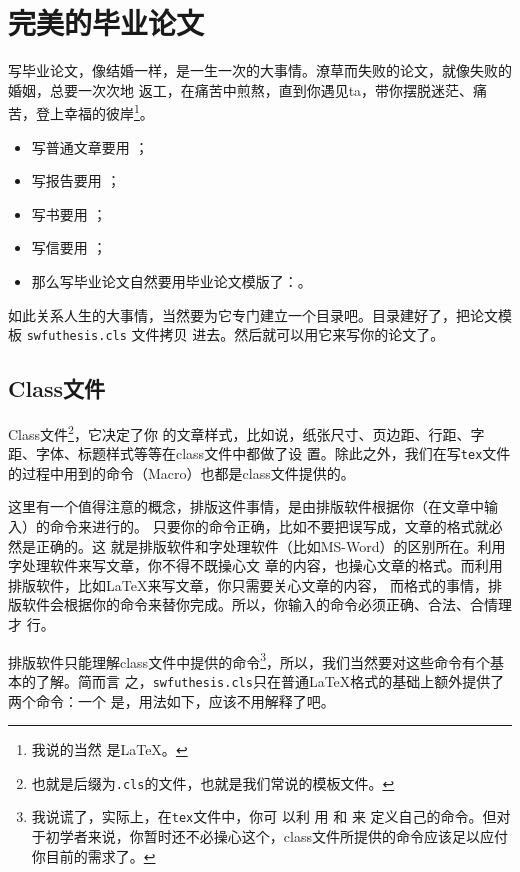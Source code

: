 \chapter{完美的毕业论文}
\label{cha:thesis}

写毕业论文，像结婚一样，是一生一次的大事情。潦草而失败的论文，就像失败的婚姻，总要一次次地
返工，在痛苦中煎熬，直到你遇见ta，带你摆脱迷茫、痛苦，登上幸福的彼岸\footnote{我说的当然
  是\LaTeX{}。}。

\begin{itemize}
\item[] 写普通文章要用 ；
\item[] 写报告要用 ；
\item[] 写书要用 ；
\item[] 写信要用 ；
\item[] 那么写毕业论文自然要用毕业论文模版了：。
\end{itemize}

如此关系人生的大事情，当然要为它专门建立一个目录吧。目录建好了，把论文模板 \texttt{swfuthesis.cls} 文件拷贝
进去。然后就可以用它来写你的论文了。

\section{Class文件}
\label{sec:class}

Class文件\footnote{也就是后缀为\texttt{.cls}的文件，也就是我们常说的模板文件。}，它决定了你
的文章样式，比如说，纸张尺寸、页边距、行距、字距、字体、标题样式等等在class文件中都做了设
置。除此之外，我们在写\texttt{tex}文件的过程中用到的命令（Macro）也都是class文件提供的。

这里有一个值得注意的概念，排版这件事情，是由排版软件根据你（在文章中输入）的命令来进行的。
只要你的命令正确，比如不要把\ltx{\author}误写成\ltx{\auther}，文章的格式就必然是正确的。这
就是排版软件和字处理软件（比如MS-Word）的区别所在。利用字处理软件来写文章，你不得不既操心文
章的内容，也操心文章的格式。而利用排版软件，比如\LaTeX{}来写文章，你只需要关心文章的内容，
而格式的事情，排版软件会根据你的命令来替你完成。所以，你输入的命令必须正确、合法、合情理才
行。

排版软件只能理解class文件中提供的命令\footnote{我说谎了，实际上，在\texttt{tex}文件中，你可
  以利
  用 \ltx{\newcommand{}}和 \ltx{\renewcommand{}}来
  定义自己的命令。但对于初学者来说，你暂时还不必操心这个，class文件所提供的命令应该足以应付
  你目前的需求了。}，所以，我们当然要对这些命令有个基本的了解。简而言
之，\texttt{swfuthesis.cls}只在普通\LaTeX{}格式的基础上额外提供了两个命令：一个
是\ltx{\swfusetup}，用法如下，应该不用解释了吧。

